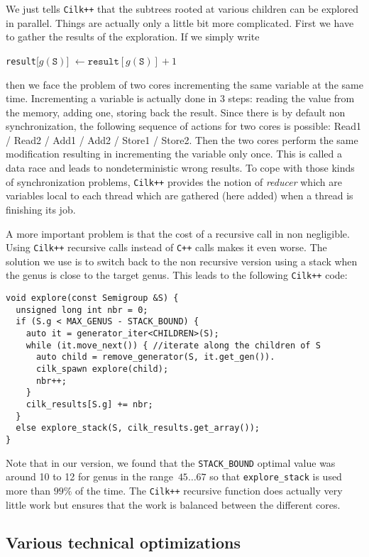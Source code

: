 \documentclass[reqno]{amsart}
\theoremstyle{plain}
\theoremstyle{definition}
\newcommand{\CilkP}{\texttt{Cilk++}\xspace}
\newcommand{\CPP}{\texttt{C++}\xspace}
\renewcommand{\tt}[1]{\texttt{#1}}
\begin{document}
We just tells \CilkP that the subtrees rooted at various children can be
explored in parallel.
Things are actually only a little bit more complicated. First we have to
gather the results of the exploration. If we simply write
\begin{center}
\tt{result}[$g(\tt{S})$] $\gets \tt{result}[g(\tt{S})] + 1$
\end{center}
then we face the problem of two cores incrementing the same variable at the
same time.
 Incrementing a variable is actually done in 3 steps: reading the
value from the memory, adding one, storing back the result. 
Since there is by
default non synchronization, the following sequence of actions for two cores
 is possible: Read1 / Read2 / Add1 / Add2 / Store1 / Store2. Then the two
cores perform the same modification resulting in incrementing the variable
only once. This is called a data race and leads to nondeterministic wrong
results. To cope with those kinds of synchronization problems, \CilkP provides the
notion of \emph{reducer} which are variables local to each thread which are
gathered (here added) when a thread is finishing its job.

A more important problem is that the cost of a recursive call in non
negligible. Using \CilkP recursive calls instead of \CPP calls makes
it even worse. The solution we use is to switch back to the non recursive
version using a stack when the genus is close to the target genus. This leads
to the following \CilkP code:
\vspace{1em}

{\small
\begin{verbatim}
void explore(const Semigroup &S) {
  unsigned long int nbr = 0;
  if (S.g < MAX_GENUS - STACK_BOUND) {
    auto it = generator_iter<CHILDREN>(S); 
    while (it.move_next()) { //iterate along the children of S
      auto child = remove_generator(S, it.get_gen()).
      cilk_spawn explore(child);
      nbr++;
    }
    cilk_results[S.g] += nbr;
  }
  else explore_stack(S, cilk_results.get_array());
}
\end{verbatim}
}
\vspace{1em}

Note that in our version, we found that the \tt{STACK\_BOUND} optimal value was
around 10 to 12 for genus in the range~$45\dots 67$ so that \tt{explore\_stack}
is used more than $99\%$ of the time. The \CilkP recursive function does
actually very little work but ensures that the work is balanced between the
different cores.

\subsection{Various technical optimizations}
\end{document}

